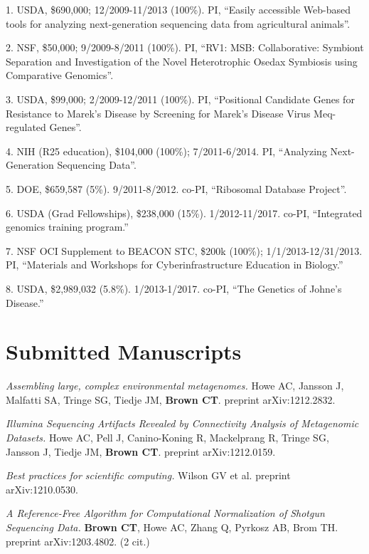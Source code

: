 \documentclass[margin,line]{resume}
\begin{document}
\begin{resume}
1. USDA, \$690,000; 12/2009-11/2013 (100\%).  PI, ``Easily accessible Web-based tools for analyzing next-generation sequencing data from agricultural animals''.  

2. NSF, \$50,000; 9/2009-8/2011 (100\%).  PI, ``RV1: MSB: Collaborative: Symbiont Separation and Investigation of the Novel Heterotrophic Osedax Symbiosis using Comparative Genomics''.

3. USDA, \$99,000; 2/2009-12/2011 (100\%).  PI, ``Positional Candidate Genes for Resistance to Marek's
Disease by Screening for Marek's Disease Virus Meq-regulated Genes''.

4. NIH (R25 education), \$104,000 (100\%); 7/2011-6/2014.  PI, ``Analyzing Next-Generation Sequencing Data''.

5. DOE, \$659,587 (5\%).  9/2011-8/2012.  co-PI, ``Ribosomal Database Project''.

6. USDA (Grad Fellowships), \$238,000 (15\%).  1/2012-11/2017.  co-PI, ``Integrated genomics training program.''

7. NSF OCI Supplement to BEACON STC, \$200k (100\%); 1/1/2013-12/31/2013.  PI, ``Materials and Workshops for Cyberinfrastructure Education in Biology.''

8. USDA, \$2,989,032 (5.8\%). 1/2013-1/2017.  co-PI, ``The Genetics of Johne's Disease.''

    \section{\mysidestyle Submitted Manuscripts}

{\em Assembling large, complex environmental metagenomes.} Howe AC, Jansson J, Malfatti SA, Tringe SG, Tiedje JM, {\bf Brown CT}. preprint arXiv:1212.2832.

{\em Illumina Sequencing Artifacts Revealed by Connectivity Analysis of Metagenomic Datasets.} Howe AC, Pell J, Canino-Koning R, Mackelprang R, Tringe SG, Jansson J, Tiedje JM, {\bf Brown CT}. preprint arXiv:1212.0159.

{\em Best practices for scientific computing.} Wilson GV et al. preprint arXiv:1210.0530.

{\em A Reference-Free Algorithm for Computational Normalization of Shotgun Sequencing Data.} {\bf Brown CT}, Howe AC, Zhang Q, Pyrkosz AB, Brom TH. preprint arXiv:1203.4802. (2 cit.)

\newpage


\end{resume}
\end{document}
